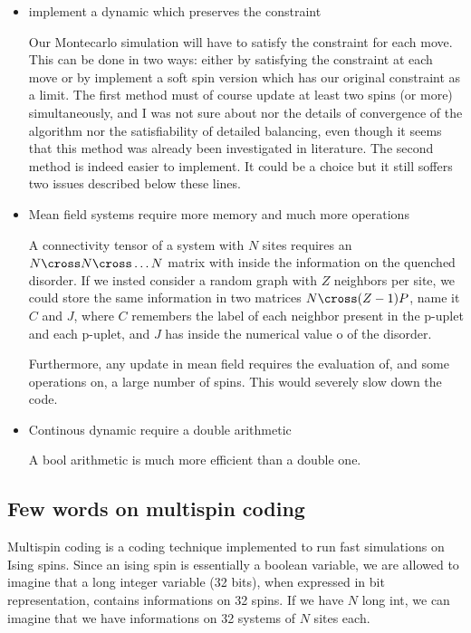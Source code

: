 \documentclass{article}
\begin{document}
\begin{itemize}
\item {implement a dynamic which preserves the constraint}

Our Montecarlo simulation will have to satisfy the constraint for each move. This can be done in two ways: 
either by satisfying the constraint at each move or by implement a soft spin version which has our original
constraint as a limit. 
The first method must of course update at least two spins (or more) simultaneously, and I was not sure about
nor the details of convergence of the algorithm nor the satisfiability of detailed balancing, even though it seems that this method was already been investigated
in literature.
The second method is indeed easier to implement. It could be a choice but it still soffers two issues described below 
these lines.

\item {Mean field systems require more memory and much more operations}

A connectivity tensor of a system with $N$ sites requires an $N \cross N \cross \dots N$ matrix with inside the information
on the quenched disorder. If we insted consider a random graph with $Z$ neighbors per site, 
we could store the same information in two matrices $N \cross (Z-1)P$, name it $C$ and $J$, where $C$ remembers 
the label of each neighbor present in the p-uplet and each p-uplet, and $J$ has inside the numerical value o
of the disorder.

Furthermore, any update in mean field requires the evaluation of, and some operations 
on, a large number of spins. This would severely slow down the code.

\item {Continous dynamic require a double arithmetic}

A bool arithmetic is much more efficient than a double one. 

\end{itemize}


\subsection{Few words on multispin coding}

Multispin coding is a coding technique implemented to run fast simulations on
Ising spins. Since an ising spin is essentially a boolean variable, we are
allowed to imagine that a long integer variable (32 bits), when expressed in
bit representation, contains informations on 32 spins. If we have $N$ long
int, we can imagine that we have informations on 32 systems of $N$ sites each.
\end{document}

